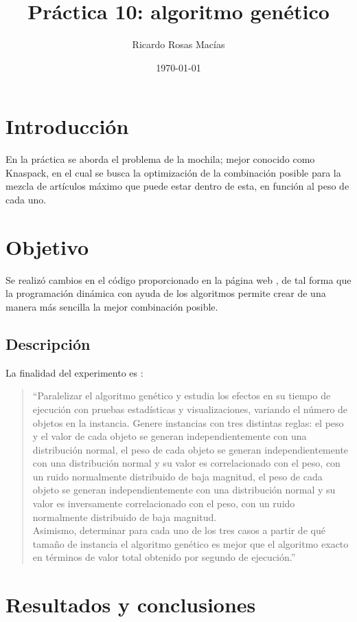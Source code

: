 \documentclass[12pt, letterpaper] {article}
\author{Ricardo Rosas Macías}
\title{Práctica 10: algoritmo genético}
\date{\today}
\begin{document}
\maketitle


\section{Introducción}
En la práctica se aborda el problema de la mochila; mejor conocido como Knaspack, en el cual se busca la optimización de la combinación posible para la mezcla de artículos máximo que puede estar dentro de esta, en función al peso de cada uno. 

 \section{Objetivo}
Se realizó cambios en el c\'odigo proporcionado en la p\'agina web \cite{elisawebAG10}, de tal forma que la programación dinámica con ayuda de los algoritmos permite crear de una manera más sencilla la mejor combinación posible.
 
 \subsection{Descripción}
 
La finalidad del experimento es \cite{elisawebAG10}:
\begin{quotation}
 ``Paralelizar el algoritmo genético y estudia los efectos en su tiempo de ejecución con pruebas estadísticas y visualizaciones, variando el número de objetos en la instancia. Genere instancias con tres distintas reglas:
el peso y el valor de cada objeto se generan independientemente con una distribución normal,
el peso de cada objeto se generan independientemente con una distribución normal y su valor es correlacionado con el peso, con un ruido normalmente distribuido de baja magnitud, el peso de cada objeto se generan independientemente con una distribución normal y su valor es inversamente correlacionado con el peso, con un ruido normalmente distribuido de baja magnitud.\\
Asimismo, determinar para cada uno de los tres casos a partir de qué tamaño de instancia el algoritmo genético es mejor que el algoritmo exacto en términos de valor total obtenido por segundo de ejecución.''
\end{quotation}

\section{Resultados y conclusiones}
\end{document}
